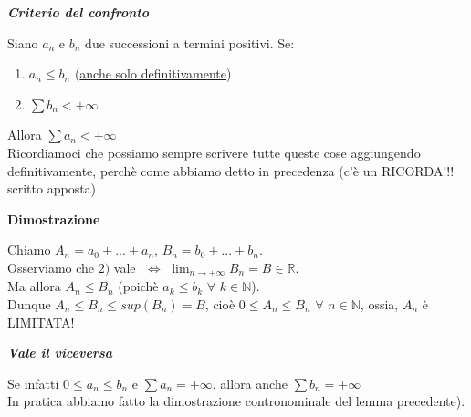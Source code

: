 \documentclass{article}
\theoremstyle{definition}
\newcommand{\R}{\mathbb{R}}
\newcommand{\N}{\mathbb{N}}
\begin{document}
\begin{center}
    \textbf{\textit{Criterio del confronto}}
\end{center}
Siano $a_n$ e $b_n$ due successioni a termini positivi. Se:
\begin{enumerate}
    \item $a_n \leqslant b_n$ (\underline{anche solo definitivamente})
    \item $\sum b_n < +\infty$
\end{enumerate}
Allora $\sum a_n < +\infty$
\\
Ricordiamoci che possiamo sempre scrivere tutte queste cose aggiungendo definitivamente, perchè come abbiamo detto in precedenza (c'è un RICORDA!!! scritto apposta)
\\
\begin{center}
    \textbf{Dimostrazione}
\end{center}
Chiamo $A_n=a_0+...+a_n$, $B_n=b_0+...+b_n$.
\\
Osserviamo che $2)$ vale $\,\, \Longleftrightarrow \,\, \lim_{n \to +\infty}B_n = B \in \R$.
\\
Ma allora $A_n \leqslant B_n$ (poichè $a_k \leqslant b_k \,\, \forall \,\, k \in \N $).
\\
Dunque $A_n \leqslant B_n \leqslant sup(B_n) =B$, cioè $0 \leqslant A_n \leqslant B_n \,\,\forall \,\, n \in \N$, ossia, $A_n$ è LIMITATA!

\begin{center}
    \textbf{\textit{Vale il viceversa}}
\end{center}
Se infatti $0 \leqslant a_n \leqslant b_n$ e $\sum a_n =+ \infty$, allora anche $\sum b_n = +\infty$
\\
In pratica abbiamo fatto la dimostrazione contronominale del lemma precedente).
\\
\end{document}
